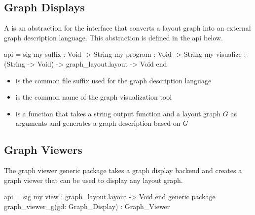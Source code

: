 \subsection{Graph Displays}

A  is an abstraction for the
interface that converts a layout graph into an external graph 
description language.  This abstraction is defined in the
api below.
\begin{SML}
 api  = sig
   my suffix    : Void -> String
   my program   : Void -> String
   my visualize : (String -> Void) -> graph_layout.layout -> Void
 end
\end{SML}
\begin{itemize}
\item {} is the common file suffix used for the graph description
language 
\item {} is the common name of the graph visualization tool
\item {} is a function that takes a 
string output function and a layout graph $G$ as arguments
and generates a graph description based on $G$
\end{itemize}

\subsection{Graph Viewers}

The graph viewer generic package 
takes a graph display backend and creates a graph viewer
that can be used to display any layout graph.

\begin{SML}
 api  = sig
    my view : graph_layout.layout -> Void
 end
 generic package graph_viewer_g(gd: Graph_Display) : Graph_Viewer
\end{SML}
